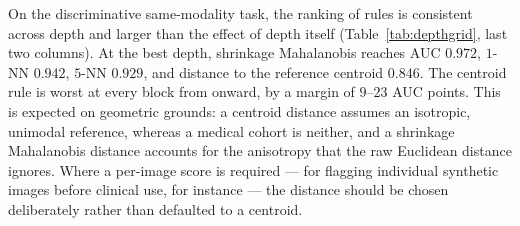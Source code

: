 On the discriminative same-modality task, the ranking of rules is consistent
across depth and larger than the effect of depth itself
(Table~\ref{tab:depthgrid}, last two columns). At the best depth, shrinkage
Mahalanobis reaches AUC $0.972$, $1$-NN $0.942$, $5$-NN $0.929$, and distance to
the reference centroid $0.846$. The centroid rule is worst at every block from
 onward, by a margin of $9$--$23$ AUC points. This is expected on
geometric grounds: a centroid distance assumes an isotropic, unimodal reference,
whereas a medical cohort is neither, and a shrinkage Mahalanobis distance
accounts for the anisotropy that the raw Euclidean distance ignores. Where a
per-image score is required --- for flagging individual synthetic images before
clinical use, for instance --- the distance should be chosen deliberately rather
than defaulted to a centroid.
